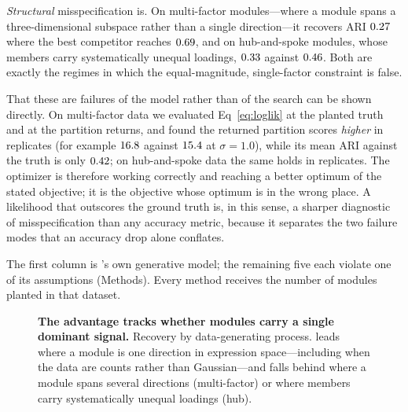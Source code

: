 \emph{Structural} misspecification is. On multi-factor modules---where a module
spans a three-dimensional subspace rather than a single direction---it recovers
ARI $0.27{}$ where the best competitor reaches
$0.69{}$, and on hub-and-spoke modules, whose members carry
systematically unequal loadings, $0.33{}$ against $0.46{}$.
Both are exactly the regimes in which the equal-magnitude, single-factor
constraint is false.

That these are failures of the model rather than of the search can be shown
directly. On multi-factor data we evaluated Eq~\eqref{eq:loglik} at the planted
truth and at the partition \tool{} returns, and found the returned partition
scores \emph{higher} in \DiagLLMultiWins{} replicates (for example $16.8{}$ against $15.4{}$ at $\sigma=1.0$), while its mean ARI against the truth is only $0.42{}$; on hub-and-spoke data the same holds in \DiagLLHubWins{} replicates. The optimizer is
therefore working correctly and reaching a better optimum of the stated
objective; it is the objective whose optimum is in the wrong place. A likelihood
that outscores the ground truth is, in this sense, a sharper diagnostic of
misspecification than any accuracy metric, because it separates the two failure
modes that an accuracy drop alone conflates.

\begin{table}
\centering
\caption{\textbf{Recovery under model misspecification} (ARI, mean $\pm$ SD over
\MisspecSeeds{} datasets per process, $\sigma=1.5$). Best method per process in
bold.}
\label{tab:misspec}
\begin{flushleft}
The first column is \tool{}'s own generative model; the remaining five each
violate one of its assumptions (Methods). Every method receives the number of
modules planted in that dataset.
\end{flushleft}
\end{table}

\begin{figure}[!h]
\caption{\textbf{The advantage tracks whether modules carry a single dominant
signal.} Recovery by data-generating process. \tool{} leads where a module is one
direction in expression space---including when the data are counts rather than
Gaussian---and falls behind where a module spans several directions
(multi-factor) or where members carry systematically unequal loadings (hub).}
\label{fig:misspec}
\end{figure}

